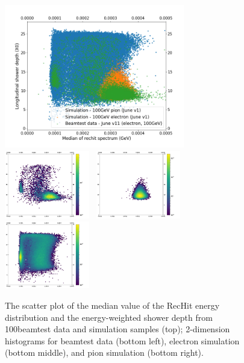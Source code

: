 \begin{figure}[!ht]
    \begin{center}  
    \includegraphics[width=0.7\textwidth]{Fig/fig_HGCAL/PionContamination_100GeV}\\
    \includegraphics[width=0.33\textwidth]{Fig/fig_HGCAL/DataJunev11_Run240_100GeV_WithoutCuts}~
    \includegraphics[width=0.33\textwidth]{Fig/fig_HGCAL/Electron_Junev1_100GeV_WithoutCuts}~
    \includegraphics[width=0.33\textwidth]{Fig/fig_HGCAL/Pion_Junev1_100GeV_WithoutCuts}\\
    \caption{The scatter plot of the median value of the RecHit energy distribution and the energy-weighted shower depth from 100\GeV beamtest data and simulation samples (top); 2-dimension histograms for beamtest data (bottom left), electron simulation (bottom middle), and pion simulation (bottom right). }
    \label{fig:pionContamination-scatter}
    \end{center}
\end{figure}

